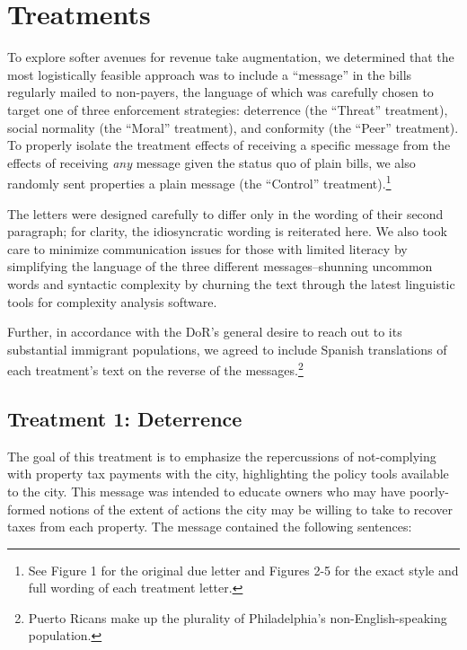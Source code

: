 \documentclass[12pt,titlepage]{article}
\begin{document}
\section{Treatments}

To explore softer avenues for revenue take augmentation, we determined
that the most logistically feasible approach was to include a
``message'' in the bills regularly mailed to non-payers, the language
of which was carefully chosen to target one of three enforcement
strategies: deterrence (the ``Threat'' treatment), social normality
(the ``Moral'' treatment), and conformity (the ``Peer'' treatment). To
properly isolate the treatment effects of receiving a specific message
from the effects of receiving \textit{any} message given the status
quo of plain bills, we also randomly sent properties a plain message
(the ``Control'' treatment).\footnote{See Figure 1 for the original due letter and 
  Figures 2-5 for the exact style and full wording of each treatment letter.}
 
The letters were designed carefully to differ only in the wording of
their second paragraph; for clarity, the idiosyncratic wording is
reiterated here. We also took care to minimize communication issues
for those with limited literacy by simplifying the language of the
three different messages--shunning uncommon words and syntactic
complexity by churning the text through the latest linguistic tools
for complexity analysis software.

Further, in accordance with the DoR's general desire to reach out to
its substantial immigrant populations, we agreed to include Spanish
translations of each treatment's text on the reverse of the
messages.\footnote{Puerto Ricans make up the plurality of
  Philadelphia's non-English-speaking population.}
  
\subsection{Treatment 1: Deterrence}

The goal of this treatment is to emphasize the repercussions
of not-complying with property tax payments with the city,
highlighting the policy tools available to the city. This message was
intended to educate owners who may have poorly-formed notions of the
extent of actions the city may be willing to take to recover taxes from
each property. The message contained the following sentences:
\end{document}
